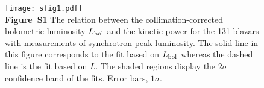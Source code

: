 \documentclass[12pt]{article}
\begin{document}
\begin{figure}[!t]
\centering
\texttt{[image: sfig1.pdf]}	%
\\
{\bf Figure~S1} The relation between the collimation-corrected bolometric luminosity $L_{\rm bol}$ and the kinetic power for the 131 blazars with measurements of synchrotron peak luminosity. The solid line in this figure corresponds to the fit based on $L_{\rm bol}$ whereas the dashed line is the fit based on $L$. The shaded regions display the $2\sigma$ confidence band of the fits. Error bars, $1 \sigma$.
\label{fig:compare}
\end{figure}




\clearpage
\end{document}
